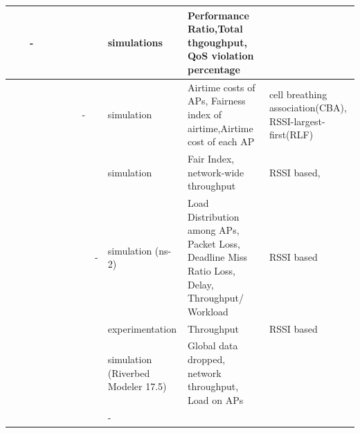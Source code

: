 \documentclass[journal,transmag]{IEEEtran}
\begin{document}
\begin{table}
\begin{tabular} {|p{}|p{.9cm}|p{.9cm}|p{.6cm}|p{.95cm}|p{1.1cm}|p{.6cm}|p{}|p{}|p{} |p{2.3cm}|p{}|}
\scriptsize{\cite{09dynamic_association_load_balancing}} &\scriptsize{} &\scriptsize{-} &\scriptsize{} &\scriptsize{} &\scriptsize{} &\scriptsize{} &\scriptsize{} &\scriptsize{} &\scriptsize{simulations} &\scriptsize{Performance Ratio,Total thgoughput, QoS violation percentage} &\scriptsize{}\\\hline

\scriptsize{\cite{10game_load_balancing_association} } &\scriptsize{} &\scriptsize{} &\scriptsize{} &\scriptsize{} &\scriptsize{} &\scriptsize{} &\scriptsize{-} &\scriptsize{} &\scriptsize{simulation} &\scriptsize{Airtime costs of APs, Fairness index of airtime,Airtime cost of each AP} &\scriptsize{cell breathing association(CBA)\cite{07Cell_Breathing}, RSSI-largest-first(RLF)}\\\hline

\scriptsize{\cite{10joint_bandwidth_association} } &\scriptsize{} &\scriptsize{} &\scriptsize{} &\scriptsize{} &\scriptsize{} &\scriptsize{} &\scriptsize{} &\scriptsize{} &\scriptsize{simulation} &\scriptsize{Fair Index, network-wide throughput} &\scriptsize{RSSI based, }\\\hline

\scriptsize{ \cite{10dynamic_load_balancing_industrial} } &\scriptsize{} &\scriptsize{} &\scriptsize{} &\scriptsize{} &\scriptsize{} &\scriptsize{} &\scriptsize{} &\scriptsize{-} &\scriptsize{simulation (ns-2)} &\scriptsize{Load Distribution among APs, Packet Loss, Deadline Miss Ratio Loss, Delay, Throughput/ Workload} &\scriptsize{RSSI based}\\\hline

\scriptsize{\cite{14load_handoff_SDN} } &\scriptsize{} &\scriptsize{} &\scriptsize{} &\scriptsize{} &\scriptsize{} &\scriptsize{} &\scriptsize{} &\scriptsize{} &\scriptsize{experimentation} &\scriptsize{Throughput} &\scriptsize{RSSI based}\\\hline

\scriptsize{\cite{15load_performance_enhancement} } &\scriptsize{} &\scriptsize{} &\scriptsize{} &\scriptsize{} &\scriptsize{} &\scriptsize{} &\scriptsize{} &\scriptsize{} &\scriptsize{simulation (Riverbed Modeler 17.5)} &\scriptsize{Global data dropped, network throughput, Load on APs} &\scriptsize{}\\\hline


\scriptsize{ } &\scriptsize{} &\scriptsize{} &\scriptsize{} &\scriptsize{} &\scriptsize{} &\scriptsize{} &\scriptsize{} &\scriptsize{} &\scriptsize{-} &\scriptsize{} &\scriptsize{}\\\hline


\end{tabular}
\end{table} 
\end{document}
